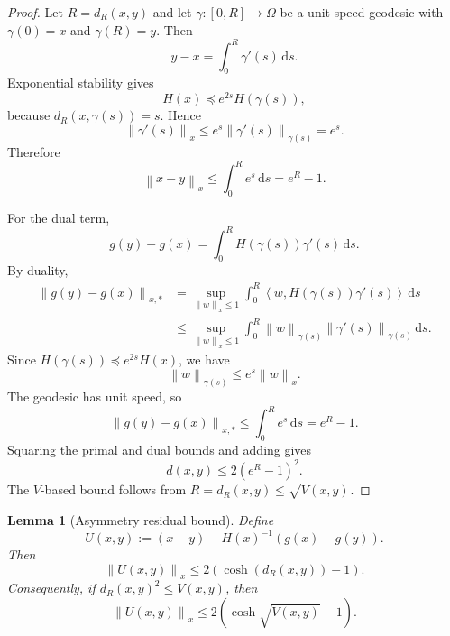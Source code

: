 \documentclass[11pt]{article}
\newtheorem{lemma}{Lemma}
\newcommand{\ip}[2]{\left\langle #1,#2\right\rangle}
\newcommand{\norm}[1]{\left\lVert #1\right\rVert}
\newcommand{\dd}{\mathrm d}
\begin{document}
\begin{proof}
Let $R=d_R(x,y)$ and let $\gamma:[0,R]\to\Omega$ be a unit-speed geodesic with
$\gamma(0)=x$ and $\gamma(R)=y$. Then
\[
    y-x=\int_0^R \gamma'(s)\,\dd s.
\]
Exponential stability gives
\[
    H(x)\preceq e^{2s}H(\gamma(s)),
\]
because $d_R(x,\gamma(s))=s$. Hence
\[
    \norm{\gamma'(s)}_x
    \le
    e^s\norm{\gamma'(s)}_{\gamma(s)}
    =e^s.
\]
Therefore
\[
    \norm{x-y}_x
    \le
    \int_0^R e^s\,\dd s
    =
    e^R-1.
\]

For the dual term,
\[
    g(y)-g(x)=\int_0^R H(\gamma(s))\gamma'(s)\,\dd s.
\]
By duality,
\[
\begin{aligned}
    \norm{g(y)-g(x)}_{x,*}
    &=
    \sup_{\norm{w}_x\le1}
    \int_0^R \ip{w}{H(\gamma(s))\gamma'(s)}\,\dd s  \\
    &\le
    \sup_{\norm{w}_x\le1}
    \int_0^R
    \norm{w}_{\gamma(s)}\norm{\gamma'(s)}_{\gamma(s)}\,\dd s.
\end{aligned}
\]
Since $H(\gamma(s))\preceq e^{2s}H(x)$, we have
\[
    \norm{w}_{\gamma(s)}\le e^s\norm{w}_x.
\]
The geodesic has unit speed, so
\[
    \norm{g(y)-g(x)}_{x,*}
    \le
    \int_0^R e^s\,\dd s
    =
    e^R-1.
\]
Squaring the primal and dual bounds and adding gives
\[
    d(x,y)\le 2(e^R-1)^2.
\]
The $V$-based bound follows from $R=d_R(x,y)\le\sqrt{V(x,y)}$.
\end{proof}

\begin{lemma}[Asymmetry residual bound]
\label{lem:Ubound}
Define
\[
    U(x,y):=(x-y)-H(x)^{-1}(g(x)-g(y)).
\]
Then
\[
    \norm{U(x,y)}_x
    \le
    2\left(\cosh(d_R(x,y))-1\right).
\]
Consequently, if $d_R(x,y)^2\le V(x,y)$, then
\[
    \norm{U(x,y)}_x
    \le
    2\left(\cosh\sqrt{V(x,y)}-1\right).
\]
\end{lemma}
\end{document}
